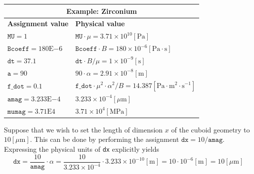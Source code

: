 \documentclass[a4paper,12pt]{article}
\begin{document}
\begin{center}
\begin{tabular}{ m{5cm}  m{8cm} }
 \multicolumn{2}{c}{\textbf{Example: Zirconium}} \\
 \hline
 \textbf{Assignment value} & \textbf{Physical value}\\
 \hline\hline
 $\texttt{MU} = 1$ & $\texttt{MU} \cdot \mu = 3.71 \times 10^{10} \left[\text{Pa}\right]$ \\
 \hline
 $\texttt{Bcoeff} = 180\text{E}{-6}$ & $\texttt{Bcoeff} \cdot B = 180 \times 10^{-6} \left[\text{Pa} \cdot \text{s}\right]$ \\
 \hline
 $\texttt{dt} = 37.1$ & $\texttt{dt} \cdot B / \mu = 1 \times 10^{-9} \left[\text{s}\right]$ \\
 \hline
 $\texttt{a} = 90$ & $90 \cdot \alpha = 2.91 \times 10^{-8} \left[\text{m}\right]$ \\
 \hline
 $\texttt{f\_dot} = 0.1$ & $\texttt{f\_dot} \cdot \mu^2 \cdot \alpha^2 / B  = 14.387 \left[\text{Pa} \cdot \text{m}^2 \cdot \text{s}^{-1}\right]$ \\
 \hline
 $\texttt{amag} = 3.233 \text{E}{-4}$ & $3.233 \times 10^{-4} \left[\mu \text{m}\right]$ \\
 \hline
 $\texttt{mumag} = 3.71 \text{E}{4}$ & $3.71 \times 10^{4} \left[\text{MPa}\right]$ \\
 \hline
\end{tabular}
\end{center}
Suppose that we wish to set the length of dimension $x$ of the cuboid geometry to $10 \left[\mu \text{m} \right]$. This can be done by performing the assignment $\texttt{dx} = 10 / \texttt{amag}$. Expressing the physical units of \texttt{dx} explicitly yields
\begin{equation*}
\texttt{dx} = \frac{10}{\texttt{amag}} \cdot \alpha = \frac{10}{3.233 \times 10^{-4}} \cdot 3.233 \times 10^{-10} \left[\text{m}\right] = 10 \cdot 10^{-6} \left[\text{m}\right] = 10 \left[\mu \text{m}\right]
\end{equation*}







\newpage
\end{document}
